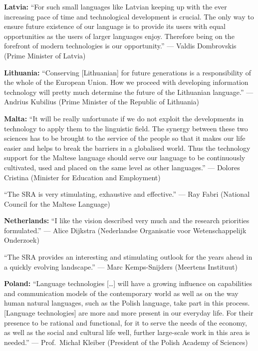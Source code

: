 \documentclass[10pt, plain]{../../metanetpaper}
\begin{document}
\medskip \textbf{Latvia:} ``For such small languages like Latvian keeping up with the ever increasing pace of time and technological development is crucial. The only way to ensure future existence of our language is to provide its users with equal opportunities as the users of larger languages enjoy. Therefore being on the forefront of modern technologies is our opportunity.'' --- Valdis Dombrovskis (Prime Minister of Latvia)

\medskip \textbf{Lithuania:} ``Conserving [Lithuanian] for future generations is a responsibility of the whole of the European Union. How we proceed with developing information technology will pretty much determine the future of the Lithuanian language.'' --- Andrius Kubilius (Prime Minister of the Republic of Lithuania)


\medskip \textbf{Malta:} ``It will be really unfortunate if we do not exploit the developments in technology to apply them to the linguistic field. The synergy between these two sciences has to be brought to the service of the people so that it makes our life easier and helps to break the barriers in a globalised world. Thus the technology support for the Maltese language should serve our language to be continuously cultivated, used and placed on the same level as other languages.'' --- Dolores Cristina (Minister for Education and Employment)

\medskip ``The SRA is very stimulating, exhaustive and effective.'' --- Ray Fabri (National Council for the Maltese Language)

\medskip \textbf{Netherlands:} ``I like the vision described very much and the research priorities formulated.'' --- Alice Dijkstra (Nederlandse Organisatie voor Wetenschappelijk Onderzoek)

\medskip ``The SRA provides an interesting and stimulating outlook for the years ahead in a quickly evolving landscape.'' --- Marc Kemps-Snijders (Meertens Instituut)

\medskip \textbf{Poland:} ``Language technologies [\dots] will have a growing influence on capabilities and communication models of the contemporary world as well as on the way human natural languages, such as the Polish language, take part in this process. [Language technologies] are more and more present in our everyday life. For their presence to be rational and functional, for it to serve the needs of the economy, as well as the social and cultural life well, further large-scale work in this area is needed.'' --- Prof.~Michał Kleiber (President of the Polish Academy of Sciences)
\end{document}
